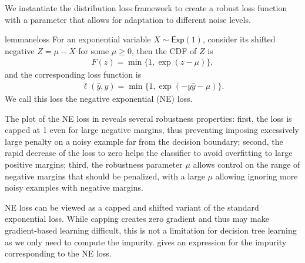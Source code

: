 \documentclass[letterpaper]{article} %
\begin{document}
We instantiate the distribution loss framework to create a robust loss function
with a parameter that allows for adaptation to different noise levels.
\begin{restatable}{lemma}{neloss}
\label{lem:neloss}
	For an exponential variable $X \sim \mathsf{Exp}(1)$, consider its shifted
	negative $Z=\mu - X$ for some $\mu \ge 0$, then the CDF of $Z$ is
	\begin{align*}
	    F(z) = \min\{1,\exp(z-\mu)\},
	\end{align*}
	and the corresponding loss function is
	\begin{align*}
	    \ell(\widehat{y},y)=\min\{1,\exp(-y\widehat{y}-\mu)\}.
	\end{align*}
	We call this loss the negative exponential (NE) loss.
\end{restatable}

The plot of the NE loss in  reveals several robustness
properties:
first, the loss is capped at 1 even for large negative margins, thus preventing
imposing excessively large penalty on a noisy example far from the decision
boundary;
second, the rapid decrease of the loss to zero helps the classifier to avoid
overfitting to large positive margins;
third, the robustness parameter $\mu$ allows control on the range of negative
margins that should be penalized, with a large $\mu$ allowing ignoring more
noisy examples with negative margins.

NE loss can be viewed as a capped and shifted variant of the standard
exponential loss.
While capping creates zero gradient and thus may make gradient-based learning
difficult, this is not a limitation for decision tree learning as we only
need to compute the impurity.
 gives an expression for the impurity corresponding to the NE
loss.
\end{document}
